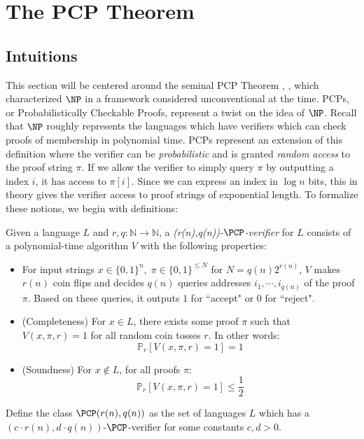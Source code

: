 \section{The PCP Theorem}
\subsection{Intuitions}
This section will be centered around the seminal PCP Theorem \cite{arora1998proof}, \cite{arora1998probabilistic}, which characterized $\NP$ in a framework considered unconventional at the time. PCPs, or Probabilistically Checkable Proofs, represent a twist on the idea of $\NP$. Recall that $\NP$ roughly represents the languages which have verifiers which can check proofs of membership in polynomial time. PCPs represent an extension of this definition where the verifier can be \emph{probabilistic} and is granted \emph{random access} to the proof string $\pi$. If we allow the verifier to simply query $\pi$ by outputting a index $i$, it has access to $\pi[i]$. Since we can express an index in $\log{n}$ bits, this in theory gives the verifier access to proof strings of exponential length. To formalize these notions, we begin with definitions:

\begin{definition} \label{pcpdef}
  Given a language $L$ and $r,q: \mathbb{N} \rightarrow \mathbb{N}$, a \emph{(r(n),q(n))-$\PCP$-verifier} for $L$ consists of a polynomial-time algorithm $V$ with the following properties: \newline

  \begin{itemize}
    \item For input strings $x \in \{0,1\}^n, \; \pi \in \{0,1\}^{\leq N}$ for $N = q(n)2^{r(n)}$, $V$ makes $r(n)$ coin flips and decides $q(n)$ queries addresses $i_1, \cdots, i_{q(n)}$ of the proof $\pi$. Based on these queries, it outputs $1$ for ``accept" or $0$ for ``reject". \newline

    \item (Completeness) For $x \in L$, there exists some proof $\pi$ such that $V(x,\pi,r) = 1$ for all random coin tosses $r$. In other words:
    \begin{equation}
      \mathbb{P}_{r}[V(x,\pi,r) = 1] = 1
    \end{equation}

    \item (Soundness) For $x \not\in L$, for all proofs $\pi$:
    \begin{equation}
      \mathbb{P}_{r}[V(x,\pi,r) = 1] \leq \frac{1}{2}
    \end{equation}
  \end{itemize}
  Define the class $\PCP(r(n),q(n))$ as the set of languages $L$ which has a $(c\cdot r(n),d\cdot q(n))$-$\PCP$-verifier for some constants $c,d > 0$.
\end{definition}

